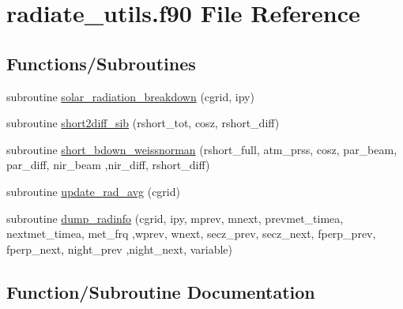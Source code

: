 \hypertarget{radiate__utils_8f90}{}\section{radiate\+\_\+utils.\+f90 File Reference}
\label{radiate__utils_8f90}
\subsection*{Functions/\+Subroutines}
\begin{DoxyCompactItemize}
\item 
subroutine \hyperlink{radiate__utils_8f90_a672952348e79808e2b0f947194522dce}{solar\+\_\+radiation\+\_\+breakdown} (cgrid, ipy)
\item 
subroutine \hyperlink{radiate__utils_8f90_a51dd2852d7a8314141edfffde24dd0af}{short2diff\+\_\+sib} (rshort\+\_\+tot, cosz, rshort\+\_\+diff)
\item 
subroutine \hyperlink{radiate__utils_8f90_a62910f26ae63e486fbfd4bd9b3883120}{short\+\_\+bdown\+\_\+weissnorman} (rshort\+\_\+full, atm\+\_\+prss, cosz, par\+\_\+beam, par\+\_\+diff, nir\+\_\+beam                                                                                                                                               ,nir\+\_\+diff, rshort\+\_\+diff)
\item 
subroutine \hyperlink{radiate__utils_8f90_a08249d25775527a48b4647e648d4b711}{update\+\_\+rad\+\_\+avg} (cgrid)
\item 
subroutine \hyperlink{radiate__utils_8f90_af4a655aaaba110eecb1a6e35746bf469}{dump\+\_\+radinfo} (cgrid, ipy, mprev, mnext, prevmet\+\_\+timea, nextmet\+\_\+timea, met\+\_\+frq                                                                                                                           ,wprev, wnext, secz\+\_\+prev, secz\+\_\+next, fperp\+\_\+prev, fperp\+\_\+next, night\+\_\+prev                                                                                               ,night\+\_\+next, variable)
\end{DoxyCompactItemize}


\subsection{Function/\+Subroutine Documentation}
\hypertarget{radiate__utils_8f90_af4a655aaaba110eecb1a6e35746bf469}{}
